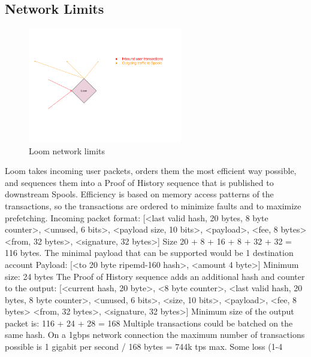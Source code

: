 \documentclass[12pt]{article}
\begin{document}
\subsection{Network Limits}

\begin{figure}
  \begin{center}
    \centering
    \includegraphics[width=0.6\textwidth]{figures/fig_10.png}
    \caption[Fig 10]{Loom network limits\label{fig_10}}
  \end{center}
  \end{figure}

Loom takes incoming user packets, orders them the most efficient way possible, and sequences them into a Proof of History sequence that is published to downstream Spools.  Efficiency is based on memory access patterns of the transactions, so the transactions are ordered to minimize faults and to maximize prefetching.
Incoming packet format:
[<last valid hash, 20 bytes, 8 byte counter>, <unused, 6 bits>, <payload size, 10 bits>, <payload>, <fee, 8 bytes> <from, 32 bytes>, <signature, 32 bytes>]
Size 20 + 8 + 16 + 8 + 32 + 32 = 116 bytes.  The minimal payload that can be supported would be 1 destination account
Payload: 
[<to 20 byte ripemd-160 hash>, <amount 4 byte>]
Minimum size: 24 bytes
The Proof of History sequence adds an additional hash and counter to the output: 
[<current hash, 20 byte>, <8 byte counter>, <last valid hash, 20 bytes, 8 byte counter>, <unused, 6 bits>, <size, 10 bits>, <payload>, <fee, 8 bytes> <from, 32 bytes>, <signature, 32 bytes>]
Minimum size of the output packet is: 116 + 24 + 28 = 168
Multiple transactions could be batched on the same hash.  On a 1gbps network connection the maximum number of transactions possible is 1 gigabit per second / 168 bytes = 744k tps max.  Some loss (1-4%
\end{document}
